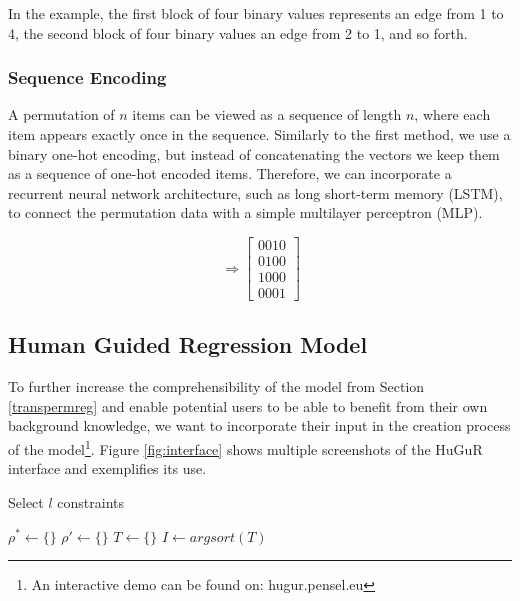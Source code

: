 In the example, the first block of four binary values represents an edge from 1 to 4, the second block of four binary values an edge from 2 to 1, and so forth.


\subsubsection{Sequence Encoding}
A permutation of $n$ items can be viewed as a sequence of length $n$, where each item appears exactly once in the sequence. Similarly to the first method, we use a binary one-hot encoding, but instead of concatenating the vectors we keep them as a sequence of one-hot encoded items. Therefore, we can incorporate a recurrent neural network architecture, such as long short-term memory (LSTM), to connect the permutation data with a simple multilayer perceptron (MLP). 

\begin{equation*}
 [ \, 3, 2, 1, 4] \, \Rightarrow \begin{bmatrix}
 0010 \\
 0100 \\
 1000 \\
 0001
 \end{bmatrix}
\end{equation*}
\par


\subsection{Human Guided Regression Model}
\label{sec:HIL}

To further increase the comprehensibility of the model from Section \ref{transpermreg} and enable potential users to be able to benefit from their own background knowledge, we want to incorporate their input in the creation process of the model\footnote{An interactive demo can be found on: hugur.pensel.eu}. Figure \ref{fig:interface} shows multiple screenshots of the HuGuR interface and exemplifies its use.

\begin{algorithm}[t!]
\caption{Select $l$ constraints}\label{alg:selconstraints}
$\rho^* \gets \{\}$\;
$\rho' \gets \{\}$\;
$T \gets \{\}$\;
$I \gets argsort(T)$
\end{algorithm}


